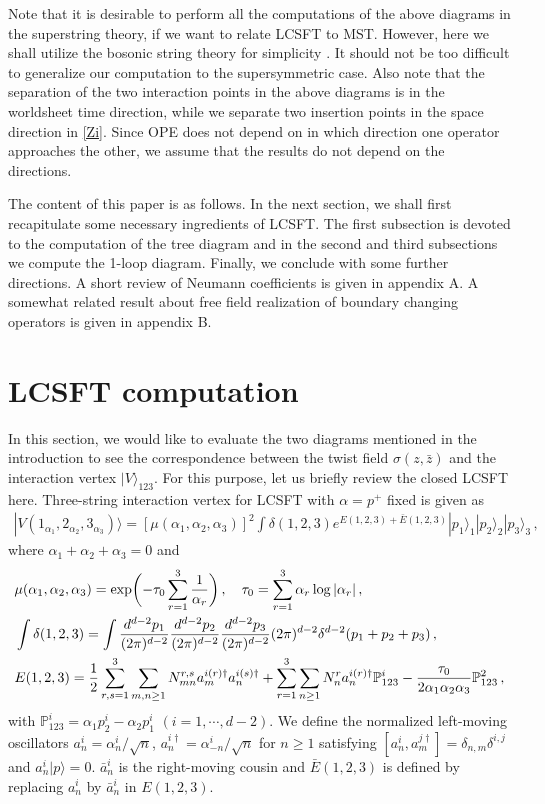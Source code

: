 \documentclass[12pt]{article}
\begin{document}
Note that it is desirable to perform all the computations of the above
diagrams in the superstring theory, if we want to relate LCSFT to
MST.
However, here we shall utilize the bosonic string theory for
simplicity \cite{Rey}.
It should not be too difficult to generalize our computation to the
supersymmetric case.
Also note that the separation of the two interaction points in the
above diagrams is in the worldsheet time direction, while we separate
two insertion points in the space direction in \eqref{Zi}.
Since OPE does not depend on in which direction one operator
approaches the other, we assume that the results do not depend on the
directions.

The content of this paper is as follows.
In the next section, we shall first recapitulate some necessary
ingredients of LCSFT.
The first subsection is devoted to the computation of the tree diagram
and in the second and third subsections we compute the 1-loop
diagram.
Finally, we conclude with some further directions.
A short review of Neumann coefficients is given in appendix A.
A somewhat related result about free field realization of boundary
changing operators is given in appendix B.

\section{LCSFT computation}
In this section, we would like to evaluate the two diagrams mentioned
in the introduction to see the correspondence between the twist field
$\sigma(z,\bar z)$ and the interaction vertex $|V\rangle_{123}$.
For this purpose, let us briefly review the closed LCSFT here.
Three-string interaction vertex for LCSFT with $\alpha=p^+$ fixed is
given as
\begin{align}
|V(1_{\alpha_1},2_{\alpha_2},3_{\alpha_3})\rangle
=[\mu(\alpha_1,\alpha_2,\alpha_3)]^2\int\delta(1,2,3)
e^{E(1,2,3)+\bar{E}(1,2,3)}|p_1\rangle_1|p_2\rangle_2|p_3\rangle_3\,,
\label{3string}
\end{align}
where $\alpha_1+\alpha_2+\alpha_3=0$ and
\begin{align}
&\mu(\alpha_1,\alpha_2,\alpha_3)
=\exp\biggl(-\tau_0\sum_{r=1}^3{1\over \alpha_r}\biggr)\,,
\quad\tau_0=\sum_{r=1}^3\alpha_r\log |\alpha_r|\,,\\
&\int\delta(1,2,3)=\int 
{d^{d-2}p_1\over (2\pi)^{d-2}}
{d^{d-2}p_2\over (2\pi)^{d-2}}
{d^{d-2}p_3\over (2\pi)^{d-2}}
(2\pi)^{d-2}\delta^{d-2}(p_1+p_2+p_3)\,,\\
&E(1,2,3)={1\over 2}\sum_{r,s=1}^3\sum_{m,n\ge 1}N^{r,s}_{mn}
a_m^{i(r)\dagger}a_n^{i(s)\dagger}
+\sum_{r=1}^3\sum_{n\ge 1}N^r_na^{i(r)\dagger}_n{\mathbb P}^i_{123}
-{\tau_0\over 2\alpha_1\alpha_2\alpha_3}{\mathbb P}^2_{123}\,,
\end{align}
with ${\mathbb P}^i_{123}=\alpha_1p_2^i-\alpha_2p_1^i$
$(i=1,\cdots,d-2)$.
We define the normalized left-moving oscillators
$a_n^i=\alpha_n^i/\sqrt{n}$, $a_n^{i\dagger}=\alpha_{-n}^i/\sqrt{n}$
for $n\ge 1$ satisfying
$[a_n^i,a_m^{j\dagger}]=\delta_{n,m}\delta^{i,j}$ and
$a_n^i|p\rangle=0$.
$\bar a_n^i$ is the right-moving cousin and $\bar E(1,2,3)$ is
defined by replacing $a_n^i$ by $\bar a_n^i$ in $E(1,2,3)$.
\end{document}
